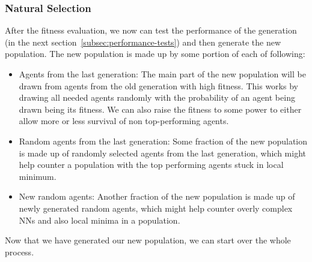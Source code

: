 \documentclass[11pt]{report}
\begin{document}
\begin{enumerate}
                \subsubsection{Natural Selection}
    After the fitness evaluation, we now can test the performance of the generation (in the next section~\ref{subsec:performance-tests}) and then generate the new population.
    The new population is made up by some portion of each of following:
    \begin{itemize}
        \item Agents from the last generation:
        The main part of the new population will be drawn from agents from the old generation with high fitness.
        This works by drawing all needed agents randomly with the probability of an agent being drawn being its fitness.
        We can also raise the fitness to some power to either allow more or less survival of non top-performing agents.
        \item Random agents from the last generation:
        Some fraction of the new population is made up of randomly selected agents from the last generation, which might help counter a population with the top performing agents stuck in local minimum.
        \item New random agents:
        Another fraction of the new population is made up of newly generated random agents, which might help counter overly complex NNs and also local minima in a population.
    \end{itemize}
    Now that we have generated our new population, we can start over the whole process.

\end{enumerate}
\end{document}
